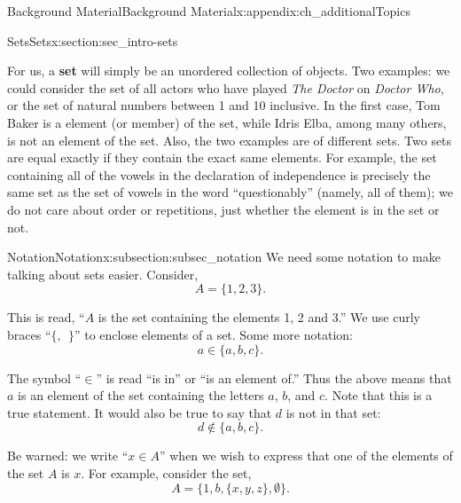 \documentclass[oneside,10pt,]{book}
\newcommand{\terminology}[1]{\textbf{#1}}
\numberwithin{equation}{chapter}
\begin{document}
\begin{appendixptx}{Background Material}{}{Background Material}{}{}{x:appendix:ch_additionalTopics}
\begin{sectionptx}{Sets}{}{Sets}{}{}{x:section:sec_intro-sets}
\begin{introduction}{}
For us, a \terminology{set}  will simply be an unordered collection of objects. Two examples: we could consider the set of all actors who have played \emph{The Doctor} on \emph{Doctor Who}, or the set of natural numbers between 1 and 10 inclusive. In the first case, Tom Baker is a element (or member) of the set, while Idris Elba, among many others, is not an element of the set. Also, the two examples are of different sets. Two sets are equal exactly if they contain the exact same elements. For example, the set containing all of the vowels in the declaration of independence is precisely the same set as the set of vowels in the word ``questionably'' (namely, all of them); we do not care about order or repetitions, just whether the element is in the set or not.%
\end{introduction}%
%
%
\typeout{************************************************}
\typeout{************************************************}
%
\begin{subsectionptx}{Notation}{}{Notation}{}{}{x:subsection:subsec_notation}
We need some notation to make talking about sets easier. Consider,%
\begin{equation*}
A = \{1, 2, 3\}.
\end{equation*}
%
\par
This is read, ``\(A\) is the set containing the elements 1, 2 and 3.'' We use curly braces ``\(\{,~~ \}\)'' to enclose elements of a set. Some more notation:%
\begin{equation*}
a \in \{a, b, c\}.
\end{equation*}
%
\par
The symbol ``\(\in\)'' is read ``is in'' or ``is an element of.'' Thus the above means that \(a\) is an element of the set containing the letters \(a\), \(b\), and \(c\). Note that this is a true statement. It would also be true to say that \(d\) is not in that set:%
\begin{equation*}
d \not\in \{a, b, c\}.
\end{equation*}
%
\par
Be warned: we write ``\(x \in A\)'' when we wish to express that one of the elements of the set \(A\) is \(x\). For example, consider the set,%
\begin{equation*}
A = \{1, b, \{x, y, z\}, \emptyset\}.
\end{equation*}
%
\par

\end{subsectionptx}
\end{sectionptx}
\end{appendixptx}
\end{document}
